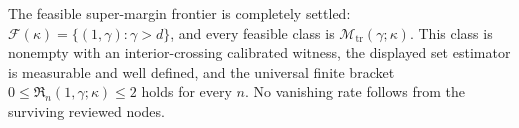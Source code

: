 The feasible super-margin frontier is completely settled: \(\mathcal F(\kappa)=\{(1,\gamma):\gamma>d\}\), and every feasible class is \(\mathcal M_{\mathrm{tr}}(\gamma;\kappa)\). This class is nonempty with an interior-crossing calibrated witness, the displayed set estimator is measurable and well defined, and the universal finite bracket \(0\le\mathfrak R_n(1,\gamma;\kappa)\le2\) holds for every \(n\). No vanishing rate follows from the surviving reviewed nodes.